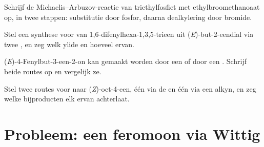 \begin{exercise}[$\star\star$]\label{exo:b2:wittig:9}
Schrijf de Michaelis--Arbuzov-reactie van triethylfosfiet met ethylbroomethanoaat op, in twee stappen:
substitutie door fosfor, daarna dealkylering door bromide.
\end{exercise}

\begin{exercise}[$\star\star\star$]\label{exo:b2:wittig:10}
Stel een synthese voor van 1,6-difenylhexa-1,3,5-trieen uit (\textit{E})-but-2-eendial
 via twee , en zeg welk ylide en hoeveel ervan.
\end{exercise}

\begin{exercise}[$\star\star\star$]\label{exo:b2:wittig:11}
(\textit{E})-4-Fenylbut-3-een-2-on kan gemaakt worden door een  of door een .
Schrijf beide routes op en vergelijk ze.
\end{exercise}

\begin{exercise}[$\star\star\star$]\label{exo:b2:wittig:12}
Stel twee routes voor naar (\textit{Z})-oct-4-een, één via de  en één via een alkyn,
en zeg welke bijproducten elk ervan achterlaat.
\end{exercise}

\section{Probleem: een feromoon via Wittig}

